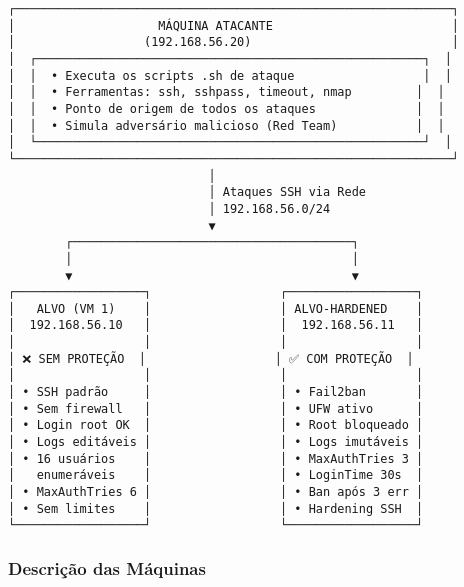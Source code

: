 \documentclass[12pt]{article}
\begin{document}
\begin{verbatim}
┌─────────────────────────────────────────────────────────────┐
│                    MÁQUINA ATACANTE                         │
│                  (192.168.56.20)                            │
│  ┌──────────────────────────────────────────────────────┐  │
│  │  • Executa os scripts .sh de ataque                  │  │
│  │  • Ferramentas: ssh, sshpass, timeout, nmap         │  │
│  │  • Ponto de origem de todos os ataques              │  │
│  │  • Simula adversário malicioso (Red Team)           │  │
│  └──────────────────────────────────────────────────────┘  │
└─────────────────────────────────────────────────────────────┘
                            │
                            │ Ataques SSH via Rede
                            │ 192.168.56.0/24
                            ▼
        ┌───────────────────────────────────────┐
        │                                       │
        ▼                                       ▼
┌──────────────────┐                  ┌──────────────────┐
│   ALVO (VM 1)    │                  │ ALVO-HARDENED    │
│  192.168.56.10   │                  │  192.168.56.11   │
│                  │                  │                  │
│ ❌ SEM PROTEÇÃO  │                  │ ✅ COM PROTEÇÃO  │
│                  │                  │                  │
│ • SSH padrão     │                  │ • Fail2ban       │
│ • Sem firewall   │                  │ • UFW ativo      │
│ • Login root OK  │                  │ • Root bloqueado │
│ • Logs editáveis │                  │ • Logs imutáveis │
│ • 16 usuários    │                  │ • MaxAuthTries 3 │
│   enumeráveis    │                  │ • LoginTime 30s  │
│ • MaxAuthTries 6 │                  │ • Ban após 3 err │
│ • Sem limites    │                  │ • Hardening SSH  │
└──────────────────┘                  └──────────────────┘
\end{verbatim}

\subsubsection{Descrição das Máquinas}
\end{document}
